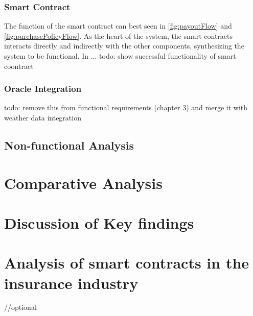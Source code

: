 \subsubsection{Smart Contract}
The function of the smart contract can best seen in \cref{fig:payoutFlow} and \cref{fig:purchasePolicyFlow}. As the heart of the system, the smart contracts interacts directly and indirectly with the other components, synthesizing the system to be functional. In ... todo: show successful functionality of smart coontract

\subsubsection{Oracle Integration}

todo: remove this from functional requirements (chapter 3) and merge it with weather data integration

\subsection{Non-functional Analysis}

\section{Comparative Analysis}

\section{Discussion of Key findings}

\section{Analysis of smart contracts in the insurance industry}\label{section:analysis_smart_contracts_insurance}
//optional

